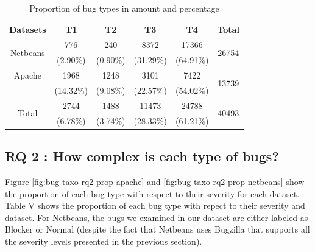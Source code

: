 \begin{table}[h!]
\centering

\begin{tabular}{c|c|c|c|c|c}
Datasets                  & T1        & T2       & T3        & T4        & Total                  \\ \hline \hline
\multirow{2}{*}{Netbeans} & 776       & 240      & 8372      & 17366     & \multirow{2}{*}{26754} \\
                          & (2.90\%)  & (0.90\%) & (31.29\%) & (64.91\%) &                        \\ \hline
Apache                    & 1968      & 1248     & 3101      & 7422      & \multirow{2}{*}{13739} \\
                          & (14.32\%) & (9.08\%) & (22.57\%) & (54.02\%) &                        \\ \hline
\multirow{2}{*}{Total}    & 2744      & 1488     & 11473     & 24788     & \multirow{2}{*}{40493} \\
                          & (6.78\%)  & (3.74\%) & (28.33\%) & (61.21\%) & \\ \hline \hline
\end{tabular}
\caption{Proportion of bug types in amount and percentage}
\label{tab:bug-taxo-rq1-prop}
\end{table}


\noindent{}

\subsection{RQ 2 : How complex is each type of bugs?}

Figure \ref{fig:bug-taxo-rq2-prop-apache} and \ref{fig:bug-taxo-rq2-prop-netbeans} show the proportion of each bug type with
respect to their severity for each dataset. Table V shows the
proportion of each bug type with repect to their severity and
dataset. For Netbeans, the bugs we examined in our dataset
are either labeled as Blocker or Normal (despite the fact that
Netbeans uses Bugzilla that supports all the severity levels
presented in the previous section).

